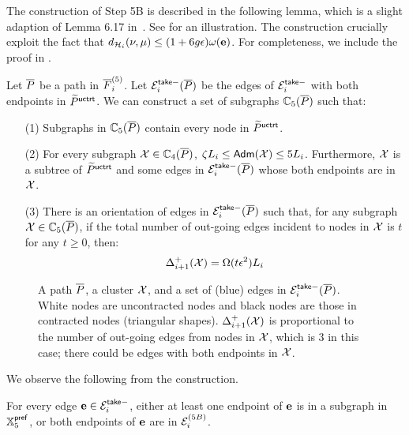 The construction of Step 5B is described in the following lemma, which is a slight adaption of Lemma 6.17 in~\cite{LS19}. See  for an illustration. The construction crucially exploit the fact that  	$d_{\mathcal{H}_i }(\nu,\mu) \leq (1+6g\epsilon) \omega(\mathbf{e})$.  For completeness, we include the proof in .


\begin{lemma}[Step 5B]\label{lm:Clustering-Step5B1E} Let $\overline{P}$ be a path in $\overline{F}^{(5)}_i$.  
	Let  $\mathcal{E}^{\mathsf{take}-}_i(\overline{P})$ be the edges of $\mathcal{E}^{\mathsf{take}-}_i$
	with both endpoints in $\widetilde{P}^{\mathsf{uctrt}}$. We can construct a set of subgraphs $\mathbb{C}_5(\overline{P})$ such that: 	
	\begin{enumerate}
		\item[(1)]  Subgraphs in $\mathbb{C}_5(\overline{P})$ contain every node in $\widetilde{P}^{\mathsf{uctrt}}$.
		\item[(2)] For every subgraph $\mathcal{X}\in \mathbb{C}_4(\overline{P})$, $\zeta L_i \leq \mathsf{Adm}(\mathcal{X})\leq 5L_i$. Furthermore, $\mathcal{X}$ is a subtree of $\widetilde{P}^{\mathsf{uctrt}}$ and some edges in  $\mathcal{E}^{\mathsf{take}-}_i(\overline{P})$  whose both endpoints are in $\mathcal{X}$.
		\item[(3)]  There is an orientation of edges in $\mathcal{E}^{\mathsf{take}-}_i(\overline{P})$  
		such that, for any subgraph $\mathcal{X} \in  \mathbb{C}_5(\overline{P})$,  if the total number of out-going edges incident to nodes in $\mathcal{X}$ is $t$ for any $t\geq 0$, then:
		\begin{equation}\label{eq:Step5Bpotential}
			\Delta^+_{i+1}(\mathcal{X}) =  \Omega(t\epsilon^2) L_i
		\end{equation}
	\end{enumerate}
\end{lemma}


\begin{figure}[!htb]
	\caption{A path $\overline{P}$, a cluster $\mathcal{X}$, and a set of (blue) edges in $\mathcal{E}^{\mathsf{take}-}_i(\overline{P})$.
		 White nodes are uncontracted nodes and black nodes are those in contracted nodes (triangular shapes). $\Delta^+_{i+1}(\mathcal{X}) $ is proportional to the number of out-going edges from nodes in $\mathcal{X}$, which is 3 in this case; there could be edges with both endpoints in $\mathcal{X}$.}
	\label{fig:5B}
\end{figure} 

We observe the following from the construction.
\begin{observation}\label{obs:MEiTakeMinus} For every edge $\mathbf{e} \in \mathcal{E}_i^{\mathsf{take}-}$, either at least one endpoint of $\mathbf{e}$ is in a subgraph in $\mathbb{X}_5^{\mathsf{pref}}$, or both endpoints of $\mathbf{e}$ are in $\mathcal{E}_i^{(5B)}$.
\end{observation}


